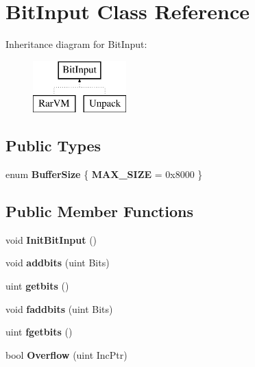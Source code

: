 \hypertarget{class_bit_input}{\section{Bit\-Input Class Reference}
\label{class_bit_input}
}
Inheritance diagram for Bit\-Input\-:\begin{figure}[H]
\begin{center}
\leavevmode
\includegraphics[height=2.000000cm]{class_bit_input}
\end{center}
\end{figure}
\subsection*{Public Types}
\begin{DoxyCompactItemize}
\item 
enum {\bfseries Buffer\-Size} \{ {\bfseries M\-A\-X\-\_\-\-S\-I\-Z\-E} = 0x8000
 \}
\end{DoxyCompactItemize}
\subsection*{Public Member Functions}
\begin{DoxyCompactItemize}
\item 
\hypertarget{class_bit_input_afa023e3612918c9b1c7b7af04e72c665}{void {\bfseries Init\-Bit\-Input} ()}\label{class_bit_input_afa023e3612918c9b1c7b7af04e72c665}

\item 
\hypertarget{class_bit_input_ab996a671a72ba39cd72fa654d17dd043}{void {\bfseries addbits} (uint Bits)}\label{class_bit_input_ab996a671a72ba39cd72fa654d17dd043}

\item 
\hypertarget{class_bit_input_a83f6fc69abea5ce4f84af537d0fa5307}{uint {\bfseries getbits} ()}\label{class_bit_input_a83f6fc69abea5ce4f84af537d0fa5307}

\item 
\hypertarget{class_bit_input_ad9d7dab7ad2ce436824c0241441304f9}{void {\bfseries faddbits} (uint Bits)}\label{class_bit_input_ad9d7dab7ad2ce436824c0241441304f9}

\item 
\hypertarget{class_bit_input_a74d822074d53902c6cc4c5803ac91131}{uint {\bfseries fgetbits} ()}\label{class_bit_input_a74d822074d53902c6cc4c5803ac91131}

\item 
\hypertarget{class_bit_input_a3d66ad2c5cf16bb4ac41f6ad2f6baf0e}{bool {\bfseries Overflow} (uint Inc\-Ptr)}\label{class_bit_input_a3d66ad2c5cf16bb4ac41f6ad2f6baf0e}

\end{DoxyCompactItemize}
